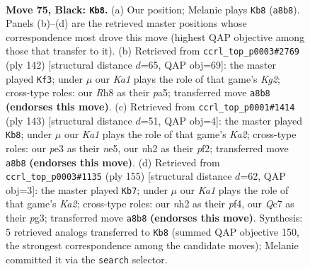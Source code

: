 \documentclass[11pt]{article}
\begin{document}
\clearpage

\begin{figure}[p]\centering
\begin{subfigure}{0.46\textwidth}\centering
\resizebox{\linewidth}{!}{%
\newchessgame
\chessboard[
  setfen={k4r1r/p1q3p1/7p/3Q3P/3P2P1/4P3/7N/4b2K b - - 0 75},
  showmover=false,
  pgfstyle=straightmove, color=movearrow, markmove={a8-b8}
]}
\caption{}
\end{subfigure}\hfill
\begin{subfigure}{0.46\textwidth}\centering
\resizebox{\linewidth}{!}{%
\newchessgame
\chessboard[
  setfen={6nk/5Q1p/4P1p1/p2p2q1/8/1p6/1P3RK1/8 w - - 16 72},
  showmover=false,
  pgfstyle=straightmove, color=movearrow, markmove={g2-f3}
]}
\caption{}
\end{subfigure}
\\[4pt]
\begin{subfigure}{0.46\textwidth}\centering
\resizebox{\linewidth}{!}{%
\newchessgame
\chessboard[
  setfen={8/k1q5/1p6/1P1QNK2/3P2P1/p1r5/5P2/8 b - - 12 72},
  showmover=false,
  pgfstyle=straightmove, color=movearrow, markmove={a7-b8}
]}
\caption{}
\end{subfigure}\hfill
\begin{subfigure}{0.46\textwidth}\centering
\resizebox{\linewidth}{!}{%
\newchessgame
\chessboard[
  setfen={8/k1r5/1pr3p1/p6p/P3QP2/1P4PK/7P/8 b - - 12 78},
  showmover=false,
  pgfstyle=straightmove, color=movearrow, markmove={a7-b7}
]}
\caption{}
\end{subfigure}
\caption{\textbf{Move 75, Black: \texttt{Kb8}.} (a) Our position; Melanie plays \texttt{Kb8} (\texttt{a8b8}). Panels (b)--(d) are the retrieved master positions whose correspondence most drove this move (highest QAP objective among those that transfer to it). (b) Retrieved from \texttt{ccrl\_top\_p0003\#2769} (ply 142) [structural distance $d$=65, QAP obj=69]: the master played \texttt{Kf3}; under $\mu$ our \emph{Ka1} plays the role of that game's \emph{Kg2}; cross-type roles: our \emph{R}h8 as their \emph{p}a5; transferred move \texttt{a8b8} \textbf{(endorses this move)}. (c) Retrieved from \texttt{ccrl\_top\_p0001\#1414} (ply 143) [structural distance $d$=51, QAP obj=4]: the master played \texttt{Kb8}; under $\mu$ our \emph{Ka1} plays the role of that game's \emph{Ka2}; cross-type roles: our \emph{p}e3 as their \emph{n}e5, our \emph{n}h2 as their \emph{p}f2; transferred move \texttt{a8b8} \textbf{(endorses this move)}. (d) Retrieved from \texttt{ccrl\_top\_p0003\#1135} (ply 155) [structural distance $d$=62, QAP obj=3]: the master played \texttt{Kb7}; under $\mu$ our \emph{Ka1} plays the role of that game's \emph{Ka2}; cross-type roles: our \emph{n}h2 as their \emph{p}f4, our \emph{Q}c7 as their \emph{p}g3; transferred move \texttt{a8b8} \textbf{(endorses this move)}. Synthesis: 5 retrieved analogs transferred to \texttt{Kb8} (summed QAP objective 150, the strongest correspondence among the candidate moves); Melanie committed it via the \texttt{search} selector.}
\label{fig:thought-m149}
\end{figure}
\end{document}
